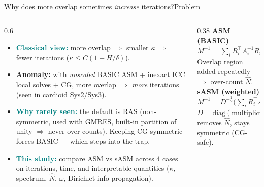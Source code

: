 \documentclass[aspectratio=169,10pt]{beamer}
\begin{document}
\begin{frame}{Why does more overlap sometimes \emph{increase} iterations?}{Problem}
  \begin{columns}[T]
  \begin{column}{0.6\linewidth}
   \begin{itemize}\setlength\itemsep{0.6em}
    \item \textcolor{teal}{\textbf{Classical view:}} more overlap $\Rightarrow$ smaller $\kappa$ $\Rightarrow$ fewer iterations
      ($\kappa\le C(1+H/\delta)$).
    \item \textcolor{sasm}{\textbf{Anomaly:}} with \emph{unscaled} BASIC ASM + inexact ICC local solves + CG,
      more overlap $\Rightarrow$ \emph{more} iterations (seen in cardioid Sys2/Sys3).
    \item \textcolor{teal}{\textbf{Why rarely seen:}} the default is RAS (non-symmetric, used with GMRES, built-in
      partition of unity $\Rightarrow$ never over-counts). Keeping CG symmetric forces BASIC --- which steps into the trap.
    \item \textcolor{teal}{\textbf{This study:}} compare ASM vs sASM across 4 cases on iterations, time, and
      interpretable quantities ($\kappa$, spectrum, $\hat N$, $\omega$, Dirichlet-info propagation).
   \end{itemize}
  \end{column}
  \begin{column}{0.38\linewidth}
   \footnotesize
   \setlength{\fboxsep}{8pt}
   \textcolor{asm}{\textbf{ASM (BASIC)}}\\[2pt]
   $\displaystyle M^{-1}=\sum_i R_i^{\top} A_i^{-1} R_i$\\[3pt]
   \textcolor{muted}{Overlap region added repeatedly $\Rightarrow$ over-count $\hat N$.}\\[1.1em]
   \textcolor{sasm}{\textbf{sASM (weighted)}}\\[2pt]
   $\displaystyle M^{-1}=D^{-\frac12}\Big(\sum_i R_i^{\top} A_i^{-1} R_i\Big)D^{-\frac12}$\\[3pt]
   \textcolor{muted}{$D=\mathrm{diag}(\text{multiplicity }m_k)$ removes $\hat N$, stays symmetric (CG-safe).}
  \end{column}
  \end{columns}
\end{frame}
\end{document}
